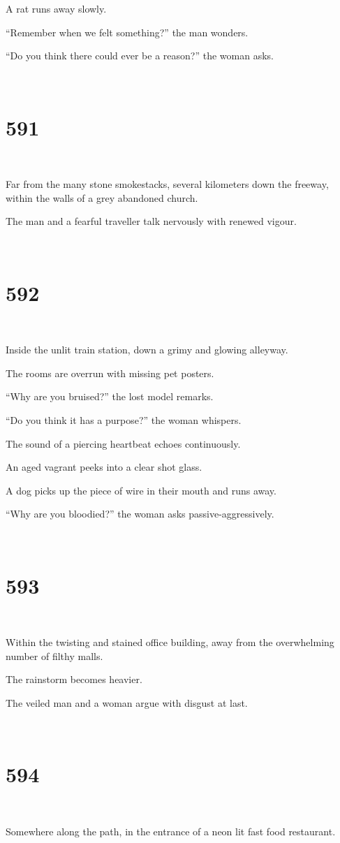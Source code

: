 \documentclass{report}
\begin{document}
A rat runs away slowly.

``Remember when we felt something?'' the man wonders.

``Do you think there could ever be a reason?'' the woman asks.

~
\chapter*{591}
~

Far from the many stone smokestacks, several kilometers down the freeway, within the walls of a grey abandoned church.

The man and a fearful traveller talk nervously with renewed vigour.

~
\chapter*{592}
~

Inside the unlit train station, down a grimy and glowing alleyway.

The rooms are overrun with missing pet posters.

``Why are you bruised?'' the lost model remarks.

``Do you think it has a purpose?'' the woman whispers.

The sound of a piercing heartbeat echoes continuously.

An aged vagrant peeks into a clear shot glass.

A dog picks up the piece of wire in their mouth and runs away.

``Why are you bloodied?'' the woman asks passive-aggressively.

~
\chapter*{593}
~

Within the twisting and stained office building, away from the overwhelming number of filthy malls.

The rainstorm becomes heavier.

The veiled man and a woman argue with disgust at last.

~
\chapter*{594}
~

Somewhere along the path, in the entrance of a neon lit fast food restaurant.
\end{document}
